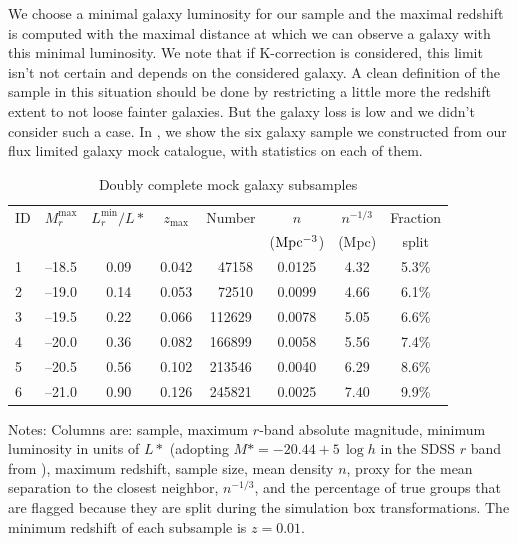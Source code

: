 We choose a minimal galaxy luminosity for our sample and the maximal redshift
is computed with the maximal distance at which we can observe a galaxy with
this minimal luminosity. We note that if K-correction is considered, this
limit isn't not certain and depends on the considered galaxy. A clean
definition of the sample in this situation should be done by restricting a
little more the redshift extent to not loose fainter galaxies. But the galaxy
loss is low and we didn't consider such a case. In , we
show the six galaxy sample we constructed from our flux limited galaxy mock
catalogue, with statistics on each of them.
%
\begin{table}[htb]
    \caption{Doubly complete mock galaxy subsamples\label{tab:samples}}
    \begin{center}
    \setlength{\tabcolsep}{3pt}
    \begin{tabular}{lccccccc}
    \toprule
    \toprule
    ID & $M_r^{\max}$ & $L_r^{\min}/L*$ & $z_{ \max }$ & Number & $n$
    & $n^{-1/3}$ & Fraction\\
              &            &     &                 &        & ($\rm  Mpc^{-3}$)
    & (Mpc) & split\\
    \toprule
    1 & --18.5 & 0.09 & 0.042 & \ \,47158 & 0.0125 & 4.32 & 5.3\%\\
    2 & --19.0 & 0.14 & 0.053 & \ \,72510 & 0.0099 & 4.66 & 6.1\%\\
    3 & --19.5 & 0.22 & 0.066 & 112629    & 0.0078 & 5.05 & 6.6\%\\
    4 & --20.0 & 0.36 & 0.082 & 166899    & 0.0058 & 5.56 & 7.4\%\\
    5 & --20.5 & 0.56 & 0.102 & 213546    & 0.0040 & 6.29 & 8.6\%\\
    6 & --21.0 & 0.90 & 0.126 & 245821    & 0.0025 & 7.40 & 9.9\%\\
    \bottomrule
    \end{tabular}
    \end{center}
    \parbox{\hsize}{\footnotesize Notes: Columns are: sample, maximum $r$-band absolute
    magnitude, minimum luminosity in units of $L*$ (adopting $M*=-20.44 +
    5\,\log h$ in the SDSS $r$ band from \citealp{Blanton+03}), maximum
    redshift, sample size, mean density $n$, proxy for the mean separation to
    the closest neighbor, $n^{-1/3}$, and the percentage of true groups that
    are flagged because they are split during the simulation box
    transformations. The minimum redshift of each subsample is $z=0.01$.
}
\end{table}


